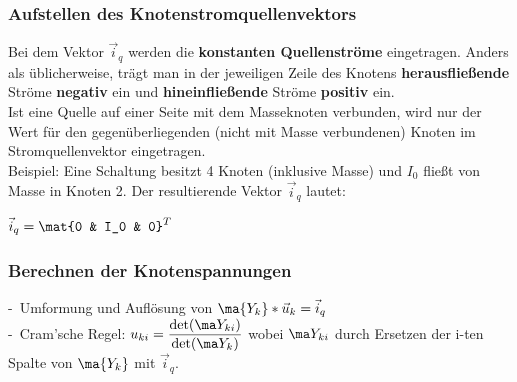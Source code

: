 \documentclass[fs, footer]{latex4ei}
\begin{document}
\begin{multicols*}{4}
    \subsubsection{Aufstellen des Knotenstromquellenvektors}
    Bei dem Vektor $\vec i_{q}$ werden die \textbf{konstanten Quellenströme} eingetragen.
    Anders als üblicherweise, trägt man in der jeweiligen Zeile des Knotens \textbf{herausfließende} Ströme \textbf{negativ} ein und \textbf{hineinfließende} Ströme \textbf{positiv} ein.\\

    Ist eine Quelle auf einer Seite mit dem Masseknoten verbunden, wird nur der Wert für den gegenüberliegenden (nicht mit Masse verbundenen) Knoten im Stromquellenvektor eingetragen.\\

    Beispiel: Eine Schaltung besitzt 4 Knoten (inklusive Masse) und $I_0$ fließt von Masse in Knoten 2. Der resultierende Vektor $\vec i_q$ lautet:
    \begin{center} %
    $\vec i_{q} = \mat{0 & I_0 & 0}^T$
    \end{center}

    \subsubsection{Berechnen der Knotenspannungen}
    -\ Umformung und Auflösung von $\ma {Y_k} * \vec u_k = \vec i_q$\\
    -\ Cram'sche Regel: $u_{ki} = \frac{\det(\ma Y_{ki})}{\det(\ma Y_k)}$ wobei $\ma Y_{ki}$ durch Ersetzen der i-ten Spalte von $\ma {Y_k}$ mit $\vec i_q$.\\


\end{multicols*}
\end{document}

